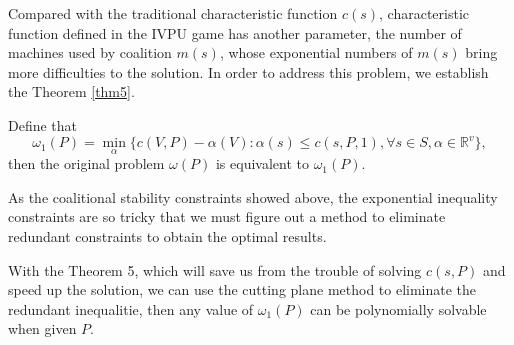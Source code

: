 Compared with the traditional characteristic function $c(s)$, characteristic function defined in the IVPU game has another parameter, the number of machines used by coalition $m(s)$, whose exponential numbers of $m(s)$ bring more difficulties to the solution.
In order to address this problem, we establish the Theorem \ref{thm5}.

\begin{thm}\label{thm7}
  Define that
  \[
    {\omega_1(P)}=\mathop{\min}_{\alpha}\{c(V,P)-\alpha(V): \alpha(s)\leq c(s,P,1), \forall s \in S, \alpha\in\mathbb{R}^{v}\},
  \]
then the original problem $\omega(P)$ is equivalent to $\omega_1(P)$.
\end{thm}

As the coalitional stability constraints showed above, the exponential inequality constraints are so tricky that we must figure out a method to eliminate redundant constraints to obtain the optimal results.

With the Theorem 5, which will save us from the trouble of solving $c(s, P)$ and speed up the solution, we can use the cutting plane method to eliminate the redundant inequalitie, then  any value of $\omega_1(P)$ can be polynomially solvable when given $P$.
